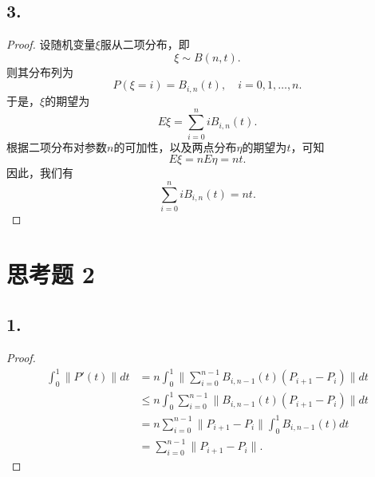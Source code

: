 \documentclass[utf8]{ctexart}
\begin{document}
\subsection*{3.}
\begin{proof}
    设随机变量$\xi$服从二项分布，即
$$
\xi\sim B(n,t).
$$
则其分布列为
$$
P(\xi = i) = B_{i,n}(t),\quad i = 0,1,\dots,n.
$$
于是，$\xi$的期望为
$$
E\xi = \sum_{i=0}^niB_{i,n}(t).
$$
根据二项分布对参数$n$的可加性，以及两点分布$\eta$的期望为$t$，可知
$$
E\xi = nE\eta = nt.
$$
因此，我们有
$$
\sum_{i=0}^niB_{i,n}(t) = nt.
$$
\end{proof}

\section*{思考题 2}
\subsection*{1.}
\begin{proof}
    $$
    \begin{aligned}
        \int_0^1\|P'(t)\|dt &= n\int_0^1\|\sum_{i=0}^{n-1}B_{i,n-1}(t)(P_{i+1}-P_i)\|dt\\
        &\leq n\int_0^1\sum_{i=0}^{n-1}\|B_{i,n-1}(t)(P_{i+1}-P_i)\| dt\\
        &= n\sum_{i=0}^{n-1}\|P_{i+1}-P_i\|\int_0^1B_{i,n-1}(t)dt\\
        &= \sum_{i=0}^{n-1}\|P_{i+1}-P_i\|.
    \end{aligned}
    $$
\end{proof}
\end{document}
